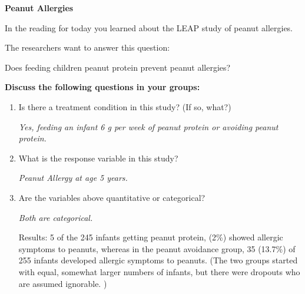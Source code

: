 \def\theTopic{Peanut Allergies}
\def\dayNum{12 }

\begin{center}
{\bf {\large Peanut Allergies}}
\end{center}
\vspace{-.1in}

In the reading for today you learned about the LEAP study of peanut
allergies. 

The researchers want to answer this question:
\begin{center}
  {\large\sf  Does feeding children peanut protein prevent peanut allergies?} 
\end{center}
{\bf
Discuss the following questions	in your groups:}
\begin{enumerate}
  \item  Is there a treatment condition in this study? (If so, what?)
\begin{students}
\vspace{2cm}
\end{students}

\begin{key}
  {\it Yes, feeding an infant 6 g per week of peanut protein or avoiding
    peanut protein. }
\end{key}


  \item  What is the response variable in this study?
\begin{students}
\vspace{2cm}
\end{students}

\begin{key}
  {\it  Peanut Allergy at age 5 years. }
\end{key}

  \item  Are the variables above quantitative or categorical?
\begin{students}
\vspace{2cm}
\end{students}

\begin{key}
  {\it  Both are categorical. }
\end{key}


Results: 5 of the 245 infants getting peanut protein,  (2\%)  showed
allergic symptoms to peanuts, whereas in the peanut
avoidance group, 35 (13.7\%) of 255 infants developed allergic
symptoms to peanuts. (The two groups started with equal, somewhat
larger numbers of infants, but there were dropouts who are assumed
ignorable. )



\end{enumerate}
